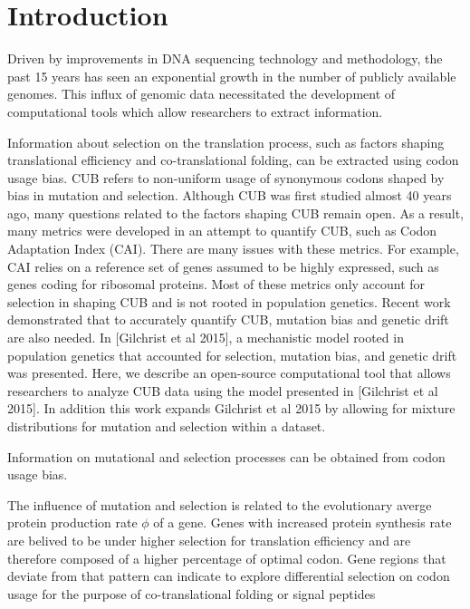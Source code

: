 \documentclass{bioinfo}
\begin{document}
\section*{Introduction}
Driven by improvements in DNA sequencing technology and methodology, the past 15 years has seen an exponential growth in the number of publicly available genomes. 
This influx of genomic data necessitated the development of computational tools which allow researchers to extract information.

Information about selection on the translation process, such as factors shaping translational efficiency and co-translational folding, can be extracted using codon usage bias.
CUB refers to non-uniform usage of synonymous codons shaped by bias in mutation and selection.
Although CUB was first studied almost 40 years ago, many questions related to the factors shaping CUB remain open.
As a result, many metrics were developed in an attempt to quantify CUB, such as Codon Adaptation Index (CAI).
There are many issues with these metrics.
For example, CAI relies on a reference set of genes assumed to be highly expressed, such as genes coding for ribosomal proteins.
Most of these metrics only account for selection in shaping CUB and is not rooted in population genetics. 
Recent work demonstrated that to accurately quantify CUB, mutation bias and genetic drift are also needed.
In [Gilchrist et al 2015], a mechanistic model rooted in population genetics that accounted for selection, mutation bias, and genetic drift was presented. 
Here, we describe an open-source computational tool that allows researchers to analyze CUB data using the model presented in [Gilchrist et al 2015].
In addition this work expands Gilchrist et al 2015 by allowing for mixture distributions for mutation and selection within a dataset.

Information on mutational and selection processes can be obtained from codon usage bias.
 
The influence of mutation and selection is related to the evolutionary averge protein production rate $\phi$ of a gene.
Genes with increased protein synthesis rate are belived to be under higher selection for translation efficiency and are therefore composed of a higher percentage of optimal codon.
Gene regions that deviate from that pattern can indicate to explore differential selection on codon usage for the purpose of co-translational folding or signal peptides
\end{document}

